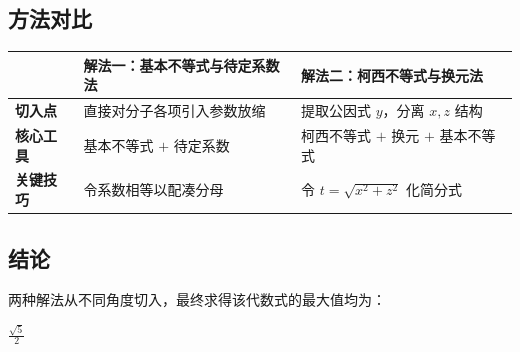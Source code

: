 \documentclass[11pt,a4paper]{ctexart}
\begin{document}
\begin{summarybox}

\subsection*{方法对比}

\begin{tabular}{@{}>{\sffamily\bfseries}p{2.8cm} p{5.5cm} p{5.5cm}@{}}
\toprule
& \color{maincolor} \textbf{解法一：基本不等式与待定系数法} & \color{borderblue} \textbf{解法二：柯西不等式与换元法} \\
\midrule
\textbf{切入点}   & 直接对分子各项引入参数放缩 & 提取公因式 $y$，分离 $x,z$ 结构 \\
\textbf{核心工具} & 基本不等式 $+$ 待定系数 & 柯西不等式 $+$ 换元 $+$ 基本不等式 \\
\textbf{关键技巧} & 令系数相等以配凑分母 & 令 $t=\sqrt{x^2+z^2}$ 化简分式 \\
\bottomrule
\end{tabular}

\vspace{1em}

\subsection*{结论}

两种解法从不同角度切入，最终求得该代数式的最大值均为：

\begin{center}
\begin{tcolorbox}[
  enhanced, colframe=accent!80, colback=accent!10,
  sharp corners, boxrule=1.5pt, width=6cm, center,
]
  {\color{maincolor}\sffamily\bfseries\LARGE $\displaystyle \frac{\sqrt{5}}{2}$}
\end{tcolorbox}
\end{center}

\end{summarybox}
\end{document}
